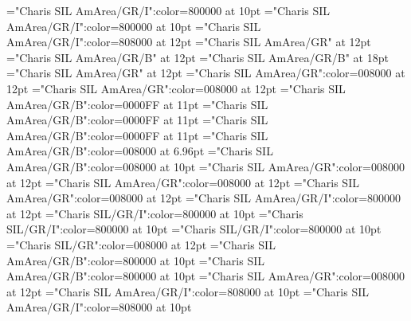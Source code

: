 \documentclass[a4paper,twoside]{article}
\begin{document}
\font\spanmxbheadwordconfigtargetconfigtargetslexsensereferencelexsensereferencesmainentrysubsenses="Charis SIL AmArea/GR/I":color=800000 at 10pt
\font\spanheadwordconfigtargetconfigtargetslexsensereferencelexsensereferencesmainentrysubsenses="Charis SIL AmArea/GR/I":color=800000 at 10pt
\font\translationstes="Charis SIL AmArea/GR/I":color=808000 at 12pt
\font\spanheadwordconfigtargetconfigtargets="Charis SIL AmArea/GR" at 12pt
\font{}="Charis SIL AmArea/GR/B" at 12pt
\font{}="Charis SIL AmArea/GR/B" at 18pt
\font{}="Charis SIL AmArea/GR" at 12pt
\font\entryletDatadicBody="Charis SIL AmArea/GR":color=008000 at 12pt
\font\mainheadwordentryletDatadicBody="Charis SIL AmArea/GR":color=008000 at 12pt
\font\spanmxbmainheadwordentryletDatadicBody="Charis SIL AmArea/GR/B":color=0000FF at 11pt
\font\aspanmxbmainheadwordentryletDatadicBody="Charis SIL AmArea/GR/B":color=0000FF at 11pt
\font\spanmainheadwordentryletDatadicBody="Charis SIL AmArea/GR/B":color=0000FF at 11pt
\font\homographnumberentryletDatadicBody="Charis SIL AmArea/GR/B":color=008000 at 6.96pt
\font\spanhomographnumberentryletDatadicBody="Charis SIL AmArea/GR/B":color=008000 at 10pt
\font\sensesentryletDatadicBody="Charis SIL AmArea/GR":color=008000 at 12pt
\font\sharedgrammaticalinfosensesentryletDatadicBody="Charis SIL AmArea/GR":color=008000 at 12pt
\font\morphosyntaxanalysissharedgrammaticalinfosensesentryletDatadicBody="Charis SIL AmArea/GR":color=008000 at 12pt
\font\partofspeechmorphosyntaxanalysissharedgrammaticalinfosensesentryletDatadicBody="Charis SIL AmArea/GR/I":color=800000 at 12pt
\font\spanespartofspeechmorphosyntaxanalysissharedgrammaticalinfosensesentryletDatadicBody="Charis SIL/GR/I":color=800000 at 10pt
\font\spanspanespartofspeechmorphosyntaxanalysissharedgrammaticalinfosensesentryletDatadicBody="Charis SIL/GR/I":color=800000 at 10pt
\font\spanpartofspeechmorphosyntaxanalysissharedgrammaticalinfosensesentryletDatadicBody="Charis SIL/GR/I":color=800000 at 10pt
\font\sensecontentsensesentryletDatadicBody="Charis SIL/GR":color=008000 at 12pt
\font\sensenumbersensecontentsensesentryletDatadicBody="Charis SIL AmArea/GR/B":color=800000 at 10pt
\font\spansensenumbersensecontentsensesentryletDatadicBody="Charis SIL AmArea/GR/B":color=800000 at 10pt
\font\sensesensecontentsensesentryletDatadicBody="Charis SIL AmArea/GR":color=008000 at 12pt
\font{}="Charis SIL AmArea/GR/I":color=808000 at 10pt
\font{}="Charis SIL AmArea/GR/I":color=808000 at 10pt
\end{document}

